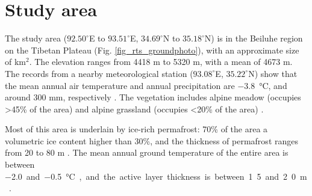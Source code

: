 \documentclass[authoryear,preprint,review,12pt]{elsarticle}
\begin{document}
\section{Study area}
\label{sec_studyarea}
The study area ($92.50^\circ$E to $93.51^\circ$E, $34.69^\circ$N to $35.18^\circ$N) is in the Beiluhe region on the Tibetan Plateau (Fig. \ref{fig_rts_groundphoto}), with an approximate size of  km$^2$. The elevation ranges from 4418 m to 5320 m, with a mean of 4673 m. The records from a nearby meteorological station ($93.08^\circ$E, $35.22^\circ$N) show that the mean annual air temperature and annual precipitation are \SI{-3.8}{\celsius}, and around 300 mm, respectively \citep{luo_thermokarst_2015}. The vegetation includes alpine meadow (occupies \textgreater 45\% of the area) and alpine grassland (occupies \textless 20\% of the area) \citep{luo_thermokarst_2015}. 

Most of this area is underlain by ice-rich permafrost: 70\% of the area  a volumetric ice content higher than 30\%, 
and the thickness of permafrost ranges from 20 to 80 m \citep{zhou_geocryology_2000, luo_thermokarst_2015}.  The mean annual ground temperature  of the entire area is between \SI{-2.0} and \SI{-0.5}{\celsius}, and the active layer thickness is between 1.5 and 2.0 m \citep{zhou_geocryology_2000, luo_thermokarst_2015, wu2010changes, wu2015changes}. %
\end{document}

